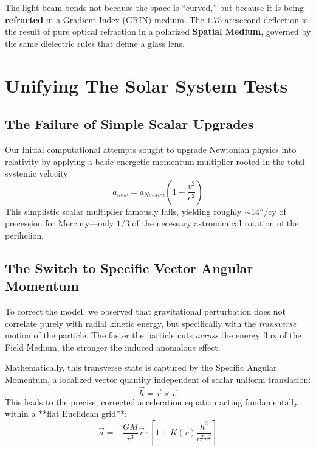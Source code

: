 \documentclass[reprint,amsmath,amssymb,aps,prd,twocolumn]{revtex4-2}
\begin{document}
The light beam bends not because the space is ``curved,'' but because it is being \textbf{refracted} in a Gradient Index (GRIN) medium. The $1.75$ arcsecond deflection is the result of pure optical refraction in a polarized \textbf{Spatial Medium}, governed by the same dielectric rules that define a glass lens.

\section{Unifying The Solar System Tests}

\subsection{The Failure of Simple Scalar Upgrades}

Our initial computational attempts sought to upgrade Newtonian physics into relativity by applying a basic energetic-momentum multiplier rooted in the total systemic velocity:
\begin{equation}
a_{new} = a_{Newton} \left( 1 + \frac{v^2}{c^2} \right)
\end{equation}
This simplistic scalar multiplier famously fails, yielding roughly $\sim 14''$/cy of precession for Mercury---only $1/3$ of the necessary astronomical rotation of the perihelion.

\subsection{The Switch to Specific Vector Angular Momentum}

To correct the model, we observed that gravitational perturbation does not correlate purely with radial kinetic energy, but specifically with the \emph{transverse} motion of the particle. The faster the particle cuts \emph{across} the energy flux of the Field Medium, the stronger the induced anomalous effect.

Mathematically, this transverse state is captured by the Specific Angular Momentum, a localized vector quantity independent of scalar uniform translation:
\begin{equation}
\vec{h} = \vec{r} \times \vec{v}
\end{equation}
This leads to the precise, corrected acceleration equation acting fundamentally within a **flat Euclidean grid**:
\begin{equation}
\vec{a} = -\frac{GM}{r^3}\vec{r} \cdot \left[ 1 + K(v) \frac{h^2}{c^2 r^2} \right]
\end{equation}
\end{document}
